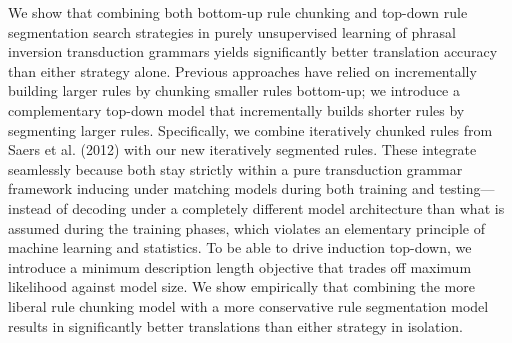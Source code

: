 We show that combining both bottom-up rule chunking and top-down rule segmentation search strategies in purely unsupervised learning of phrasal
 inversion transduction grammars yields significantly better translation
 accuracy than either strategy alone. Previous approaches have relied on
 incrementally building larger rules by chunking smaller rules bottom-up; we
 introduce a complementary top-down model that incrementally builds shorter
 rules by segmenting larger rules. Specifically, we combine iteratively chunked
 rules from Saers et al. (2012) with our new iteratively segmented rules. These
 integrate seamlessly because both stay strictly within a pure transduction
 grammar framework inducing under matching models during both training and
 testing---instead of decoding under a completely different model architecture
 than what is assumed during the training phases, which violates an elementary
 principle of machine learning and statistics. To be able to drive induction
 top-down, we introduce a minimum description length objective that trades off
 maximum likelihood against model size. We show empirically that combining the
 more liberal rule chunking model with a more conservative rule segmentation
 model results in significantly better translations than either strategy in
 isolation.


